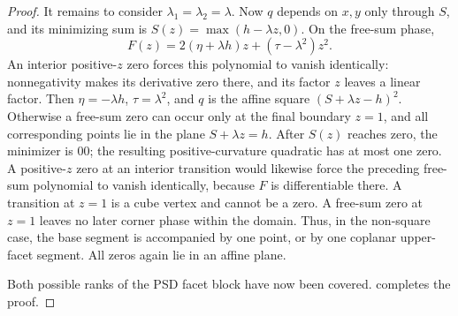 \begin{proof}
It remains to consider $\lambda_1=\lambda_2=\lambda$. Now $q$ depends on
$x,y$ only through $S$, and its minimizing sum is
$S(z)=\max(h-\lambda z,0)$. On the free-sum phase,
\[
 F(z)=2(\eta+\lambda h)z+(\tau-\lambda^2)z^2.
\]
An interior positive-$z$ zero forces this polynomial to vanish identically:
nonnegativity makes its derivative zero there, and its factor $z$ leaves
a linear factor. Then $\eta=-\lambda h$, $\tau=\lambda^2$, and $q$ is
the affine square $(S+\lambda z-h)^2$. Otherwise a free-sum zero can occur
only at the final boundary $z=1$, and all corresponding points lie in the
plane $S+\lambda z=h$. After $S(z)$ reaches zero, the minimizer is $00$;
the resulting positive-curvature quadratic has at most one zero. A
positive-$z$ zero at an interior transition would likewise force the
preceding free-sum polynomial to vanish identically, because $F$ is
differentiable there. A transition at $z=1$ is a cube vertex and cannot
be a zero. A free-sum zero at $z=1$ leaves no later corner phase within the
domain. Thus, in the non-square case, the base segment is accompanied by
one point, or by one coplanar upper-facet segment. All zeros again lie in
an affine plane.

Both possible ranks of the PSD facet block have now been covered.
 completes the proof.
\end{proof}
